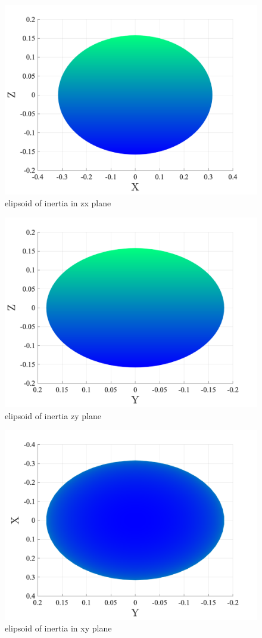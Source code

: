 \begin{figure}[H]
    \caption{elipsoid of inertia in zx plane}
    \centering
    \includegraphics[width=12cm]{../Figure/Q1/xz_view_elipsoid_inertia}
\end{figure}

\begin{figure}[H]
    \caption{elipsoid of inertia zy plane}
    \centering
    \includegraphics[width=12cm]{../Figure/Q1/yz_view_elipsoid_inertia}
\end{figure}

\begin{figure}[H]
    \caption{elipsoid of inertia in xy plane}
    \centering
    \includegraphics[width=12cm]{../Figure/Q1/xy_view_elipsoid_inertia}
\end{figure}

